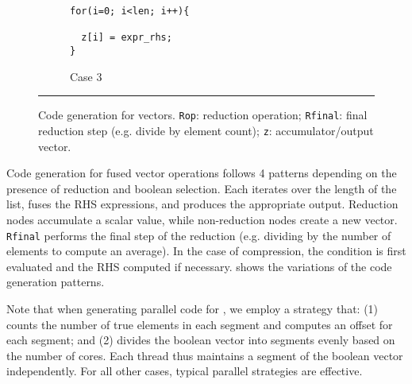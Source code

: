 \begin{figure}[htbp]
\begin{subfigure}[t]{.45\columnwidth}
\begin{small}
\begin{verbatim}
for(i=0; i<len; i++){

  z[i] = expr_rhs;
}
\end{verbatim}
\end{small}
\caption{Case 3} \label{fig:codegen_c3}
\end{subfigure}
\par\noindent\rule{\columnwidth}{0.6pt}
\caption{Code generation for vectors. \texttt{Rop}: reduction operation; \texttt{Rfinal}: final reduction step (e.g. divide by element count); \texttt{z}: accumulator/output vector.} \label{fig:codegen_vectors}
\end{figure}

Code generation for fused vector operations follows 4 patterns depending on the presence
of reduction and boolean selection. Each iterates over the length of the list, fuses the
RHS expressions, and produces the appropriate output. Reduction nodes accumulate a scalar
value, while non-reduction nodes create a new vector. \texttt{Rfinal} performs the final
step of the reduction (e.g. dividing by the number of elements to compute an average).
In the case of compression, the condition is first evaluated and the RHS computed if
necessary.  shows the variations of the code generation patterns.

Note that when generating parallel code for , we employ a
strategy that:
(1) counts the number of true elements in each segment and computes an offset for
each segment; and
(2) divides the boolean vector into segments evenly based on the number of cores.
Each thread thus maintains a segment of the boolean vector independently. For all other
cases, typical parallel strategies are effective.


